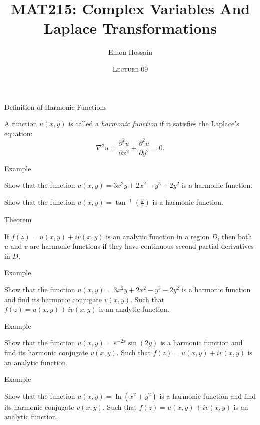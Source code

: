 \documentclass[11pt]{beamer}
\author[] %
{Emon Hossain\inst{1}}
\institute[University of Dhaka] %
{
  \inst{1}%
  Lecturer\\MNS department\\Brac University
}
\date[] %
{\textsc{Lecture-09}}
\title[]{MAT215: Complex Variables And Laplace Transformations}
\theoremstyle{plain}
\begin{document}
\begin{frame}
\titlepage
\end{frame}

\begin{frame}{Definition of Harmonic Functions}
\begin{definition}
A function $u(x,y)$ is called a \textit{harmonic function} if it satisfies the Laplace's equation:
\[\nabla^2 u=\frac{\partial^2 u}{\partial x^2} + \frac{\partial^2 u}{\partial y^2} = 0.\]
\end{definition}
\end{frame}

\begin{frame}{Example}
\begin{example}
Show that the function $u(x,y) = 3x^2y+2x^2-y^3-2y^2$ is a harmonic function.
\end{example}
\begin{example}
Show that the function $u(x,y) = \tan^{-1}\left(\frac yx\right)$ is a harmonic function.
\end{example}
\end{frame}
\begin{frame}{Theorem}
    \begin{theorem}
    If $f(z) = u(x,y) + iv(x,y)$ is an analytic function in a region $D$, then both $u$ and $v$ are harmonic functions if they have continuous second partial derivatives in $D$.
    \end{theorem}
\end{frame}

\begin{frame}{Example}
\begin{example}
Show that the function $u(x,y) = 3x^2y+2x^2-y^3-2y^2$ is a harmonic function and find its harmonic conjugate $v(x,y)$.
Such that $f(z) = u(x,y) + iv(x,y)$ is an analytic function.
\end{example}
\end{frame}

\begin{frame}{Example}
\begin{example}
Show that the function $u(x,y) = e^{-2x}\sin(2y)$ is a harmonic function and find its harmonic conjugate $v(x,y)$.
Such that $f(z) = u(x,y) + iv(x,y)$ is an analytic function.
\end{example}
\end{frame}

\begin{frame}{Example}
\begin{example}
Show that the function $u(x,y) = \ln(x^2+y^2)$ is a harmonic function and find its harmonic conjugate $v(x,y)$.
Such that $f(z) = u(x,y) + iv(x,y)$ is an analytic function.
\end{example}
\end{frame}
\end{document}
